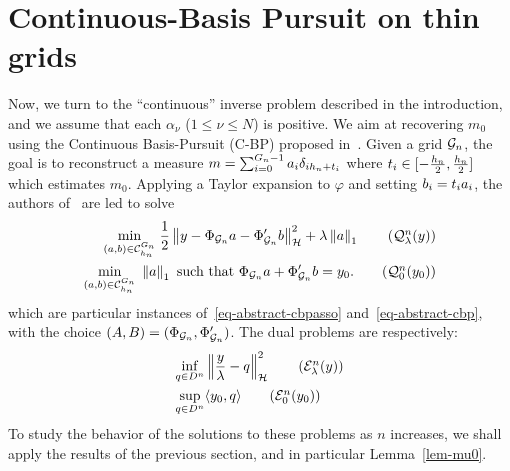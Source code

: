 
\section{Continuous-Basis Pursuit on thin grids}
\label{sec-contbp-thin}
Now, we turn to the ``continuous'' inverse problem described in the introduction, and we assume that each $\alpha_\nu$ ($1\leq \nu \leq N$) is positive. We aim at recovering $m_0$ using the Continuous Basis-Pursuit (C-BP) proposed in~\cite{Ekanadham-CBP}. Given a grid $\mathcal{G}_n$, the goal is to reconstruct a measure $m=\sum_{i=0}^{{G_n}-1} a_{i} \delta_{i{h_n}+t_i}$ where $t_i\in[-\frac{{h_n}}{2},\frac{{h_n}}{2}]$ which estimates $m_0$. Applying a Taylor expansion to $\varphi$ and setting $b_i= t_ia_i$, the authors of~\cite{Ekanadham-CBP} are led to solve
\begin{align}
  \umin{(\veccont,\shiftcont)\in \conehn^\taillegridn} \frac{1}{2}\normH{y-\Phi_{\Gg_n} \veccont-\Phi_{\Gg_n}'\shiftcont}^2 + \la \norm{\veccont}_1 \tag{$\Qq^n_\la(y)$}\label{eq-thin-cbpasso}\\
  \umin{(\veccont,\shiftcont)\in \conehn^\taillegridn} \norm{\veccont}_1 \mbox{ such that } \Phi_{\Gg_n} \veccont+ \Phi'_{\Gg_n} \shiftcont=y_0.  \tag{$\Qq^n_0(y_0)$}\label{eq-thin-cbp}
\end{align}
which are particular instances of~\eqref{eq-abstract-cbpasso} and~\eqref{eq-abstract-cbp}, with the choice $(A,B) = (\Phi_{\mathcal{G}_n},\Phi_{\mathcal{G}_n}')$.
The dual problems are respectively:
\begin{align}
  \inf_{q\in D^n} &\normH{\frac{y}{\la}-q}^2 \tag{$\Ee_\la^n(y)$}\label{eq-thin-dual-cbpasso}\\
  \sup_{q\in D^n} &\langle y_0, q\rangle \tag{$\Ee_0^n(y_0)$}\label{eq-thin-dual-cbp}
\end{align}
To study the behavior of the solutions to these problems as $n$ increases, we shall apply the results of the previous section, and in particular Lemma~\ref{lem-mu0}.


